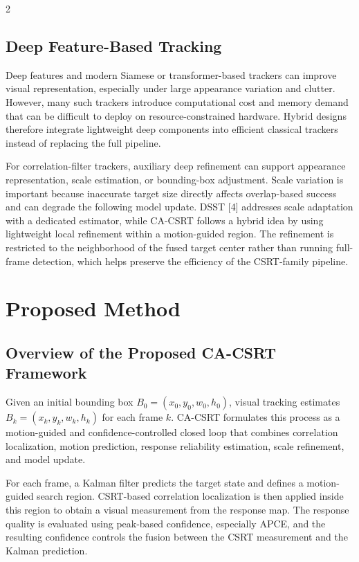 \documentclass[10pt,a4paper]{article}
\begin{document}
\begin{multicols}{2}
\subsection{Deep Feature-Based Tracking}

Deep features and modern Siamese or transformer-based trackers can improve visual representation, especially under large appearance variation and clutter. However, many such trackers introduce computational cost and memory demand that can be difficult to deploy on resource-constrained hardware. Hybrid designs therefore integrate lightweight deep components into efficient classical trackers instead of replacing the full pipeline.

For correlation-filter trackers, auxiliary deep refinement can support appearance representation, scale estimation, or bounding-box adjustment. Scale variation is important because inaccurate target size directly affects overlap-based success and can degrade the following model update. DSST [4] addresses scale adaptation with a dedicated estimator, while CA-CSRT follows a hybrid idea by using lightweight local refinement within a motion-guided region. The refinement is restricted to the neighborhood of the fused target center rather than running full-frame detection, which helps preserve the efficiency of the CSRT-family pipeline.

\section{Proposed Method}

\subsection{Overview of the Proposed CA-CSRT Framework}

Given an initial bounding box $B_0=(x_0,y_0,w_0,h_0)$, visual tracking estimates $B_k=(x_k,y_k,w_k,h_k)$ for each frame $k$. CA-CSRT formulates this process as a motion-guided and confidence-controlled closed loop that combines correlation localization, motion prediction, response reliability estimation, scale refinement, and model update.

For each frame, a Kalman filter predicts the target state and defines a motion-guided search region. CSRT-based correlation localization is then applied inside this region to obtain a visual measurement from the response map. The response quality is evaluated using peak-based confidence, especially APCE, and the resulting confidence controls the fusion between the CSRT measurement and the Kalman prediction.


\end{multicols}
\end{document}
